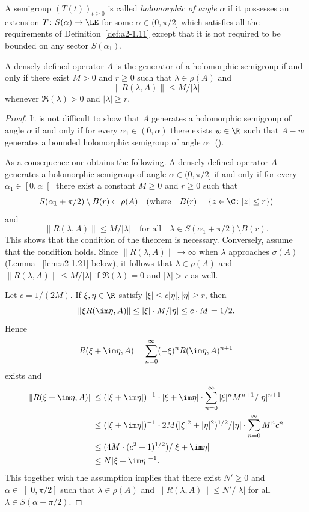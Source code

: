 A semigroup $(T(t))_{t \geq 0}$ is called \emph{holomorphic of angle} $\alpha$ if it possesses an extension $T \colon S(\alpha) \to \LE$ for some $\alpha \in (0,\pi/2]$ which satisfies all the requirements of Definition~\ref{def:a2-1.11} except that it is not required to be bounded on any sector $S(\alpha_{1})$.
\begin{theorem}\label{thm:a2-1.14}
A densely defined operator $A$ is the generator of a holomorphic semigroup if and only if there exist $M > 0$ and $r \geq 0$ such that $\lambda \in \rho(A)$ and 
%
\[
	\|R(\lambda,A)\| \leq M/|\lambda| 
\]
%
whenever $\Re(\lambda) > 0$ and $|\lambda| \geq r$.
\end{theorem}
\begin{proof}
It is not difficult to show that $A$ generates a holomorphic semigroup of angle $\alpha$ if and only if for every $\alpha_{1} \in (0,\alpha)$ there exists $w \in \R$ such that $A - w$ generates a bounded holomorphic semigroup of angle $\alpha_{1}$ (\cf \textcite[p.252]{reedsimon:1978}).

As a consequence one obtains the following.
A densely defined operator $A$ generates a holomorphic semigroup of angle $\alpha \in (0,\pi/2]$ if and only if for every $\alpha_{1} \in \left[0,\alpha\right[$ there exist a constant $M \geq 0$ and $r \geq 0$ such that 
\[
S(\alpha_{1} + \pi/2) \setminus B(r) \subset \rho(A) \quad (\text{where} \quad B(r) = \{z \in \C \colon |z| \leq r\})
\]
and
\[
\|R(\lambda,A)\| \leq M/|\lambda|  \quad \text{for all}  \quad \lambda \in S(\alpha_{1}+\pi/2) \setminus B(r).
\]
This shows that the condition of the theorem is necessary.
Conversely, assume that the condition holds.
Since $\|R(\lambda,A)\| \to \infty$ when $\lambda$ approaches $\sigma(A)$ (\cf Lemma ~\ref{lem:a2-1.21}   below), 
it follows that $\lambda \in \rho(A)$ and $\|R(\lambda,A)\| \leq M/|\lambda|$ if\/ $\Re(\lambda) = 0$ and $|\lambda| > r$ as well.

Let $c = 1/(2M)$.
If\/ $\xi, \eta \in \R$ satisfy $|\xi| \leq c|\eta|, |\eta| \geq r$, 
then 
\[
\|\xi R(\im\eta,A)\| \leq |\xi| \cdot M/|\eta| \leq c \cdot M = 1/2.
\]
Hence 
%
\[
	R(\xi+\im\eta,A) = \sum_{n=0}^\infty (-\xi)^{n}R(\im\eta,A)^{n+1} 
\]
%
exists and 
\begin{align*}
    \|R(\xi+\im\eta,A)\| &\leq 
    (|\xi + \im\eta|)^{-1} \cdot |\xi + \im\eta| \cdot \sum_{n=0}^\infty |\xi|^{n}M^{n+1}/|\eta|^{n+1}\\
    &\leq  (|\xi + \im\eta|)^{-1} \cdot 2M (|\xi|^{2} + |\eta|^{2})^{1/2} / |\eta| \cdot \sum_{n=0}^\infty M^{n}c^{n}\\   
    &\leq  (4M\cdot(c^{2}+1)^{1/2})/|\xi+\im\eta| \\
    &\leq N |\xi+\im\eta|^{-1}  . 
\end{align*}
This together with the assumption implies that there exist $N' \geq 0$ and $\alpha \in \left]0,\pi/2\right]$ such that $\lambda \in \rho(A)$ and $\|R(\lambda,A)\| \leq N'/|\lambda|$ for all $\lambda \in S(\alpha+\pi/2)$.
\end{proof}
